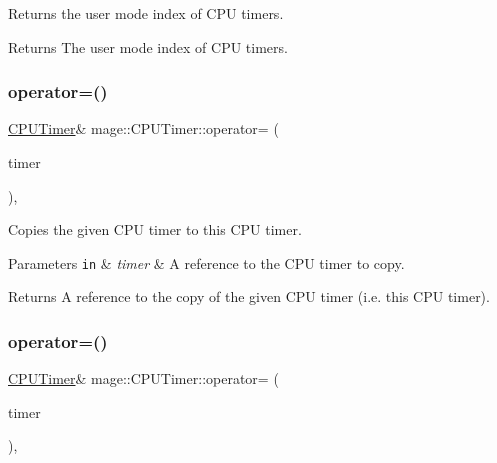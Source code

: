 Returns the user mode index of C\+PU timers.

\begin{DoxyReturn}{Returns}
The user mode index of C\+PU timers. 
\end{DoxyReturn}
\hypertarget{classmage_1_1_c_p_u_timer_a22c40a268b8638b6f78c678fc392e4b2}{}\label{classmage_1_1_c_p_u_timer_a22c40a268b8638b6f78c678fc392e4b2} 
\subsubsection{\texorpdfstring{operator=()}{operator=()}\hspace{0.1cm}{\footnotesize\ttfamily [1/2]}}
{\footnotesize\ttfamily \hyperlink{classmage_1_1_c_p_u_timer}{C\+P\+U\+Timer}\& mage\+::\+C\+P\+U\+Timer\+::operator= (\begin{DoxyParamCaption}\item[{const \hyperlink{classmage_1_1_c_p_u_timer}{C\+P\+U\+Timer} \&}]{timer }\end{DoxyParamCaption})\hspace{0.3cm}{\ttfamily [default]}, {\ttfamily [noexcept]}}

Copies the given C\+PU timer to this C\+PU timer.


\begin{DoxyParams}[1]{Parameters}
\mbox{\tt in}  & {\em timer} & A reference to the C\+PU timer to copy. \\
\hline
\end{DoxyParams}
\begin{DoxyReturn}{Returns}
A reference to the copy of the given C\+PU timer (i.\+e. this C\+PU timer). 
\end{DoxyReturn}
\hypertarget{classmage_1_1_c_p_u_timer_a9c831808d8caa71a019b5e4a6ffe360c}{}\label{classmage_1_1_c_p_u_timer_a9c831808d8caa71a019b5e4a6ffe360c} 
\subsubsection{\texorpdfstring{operator=()}{operator=()}\hspace{0.1cm}{\footnotesize\ttfamily [2/2]}}
{\footnotesize\ttfamily \hyperlink{classmage_1_1_c_p_u_timer}{C\+P\+U\+Timer}\& mage\+::\+C\+P\+U\+Timer\+::operator= (\begin{DoxyParamCaption}\item[{\hyperlink{classmage_1_1_c_p_u_timer}{C\+P\+U\+Timer} \&\&}]{timer }\end{DoxyParamCaption})\hspace{0.3cm}{\ttfamily [default]}, {\ttfamily [noexcept]}}


